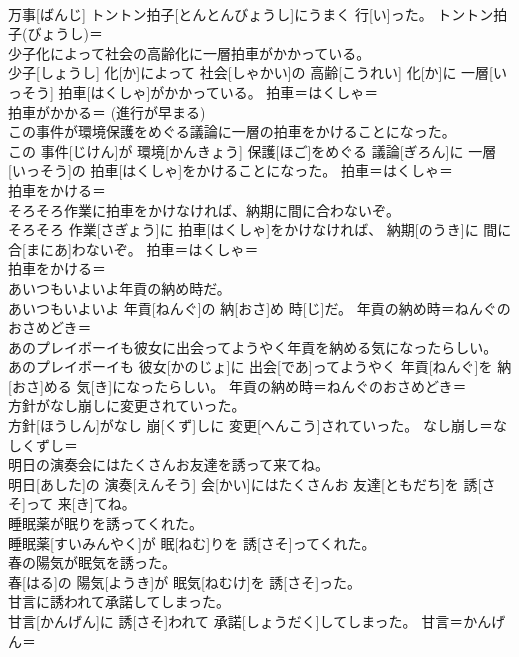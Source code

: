 \documentclass[8pt]{extreport}
\begin{document}
\begin{CJK}{UTF8}{min}
{\\	万事[ばんじ] トントン拍子[とんとんびょうし]にうまく 行[い]った。	トントン拍子(びょうし)＝ 
\\	少子化によって社会の高齢化に一層拍車がかかっている。	
\\	少子[しょうし] 化[か]によって 社会[しゃかい]の 高齢[こうれい] 化[か]に 一層[いっそう] 拍車[はくしゃ]がかかっている。	拍車＝はくしゃ＝ 
\\	拍車がかかる＝ (進行が早まる) 
\\	この事件が環境保護をめぐる議論に一層の拍車をかけることになった。	
\\	この 事件[じけん]が 環境[かんきょう] 保護[ほご]をめぐる 議論[ぎろん]に 一層[いっそう]の 拍車[はくしゃ]をかけることになった。	拍車＝はくしゃ＝ 
\\	拍車をかける＝　
\\	そろそろ作業に拍車をかけなければ、納期に間に合わないぞ。	
\\	そろそろ 作業[さぎょう]に 拍車[はくしゃ]をかけなければ、 納期[のうき]に 間に合[まにあ]わないぞ。	拍車＝はくしゃ＝ 
\\	拍車をかける＝　
\\	あいつもいよいよ年貢の納め時だ。	
\\	あいつもいよいよ 年貢[ねんぐ]の 納[おさ]め 時[じ]だ。	年貢の納め時＝ねんぐのおさめどき＝ 
\\	あのプレイボーイも彼女に出会ってようやく年貢を納める気になったらしい。	
\\	あのプレイボーイも 彼女[かのじょ]に 出会[であ]ってようやく 年貢[ねんぐ]を 納[おさ]める 気[き]になったらしい。	年貢の納め時＝ねんぐのおさめどき＝ 
\\	方針がなし崩しに変更されていった。	
\\	方針[ほうしん]がなし 崩[くず]しに 変更[へんこう]されていった。	なし崩し＝なしくずし＝ 
\\	明日の演奏会にはたくさんお友達を誘って来てね。	
\\	明日[あした]の 演奏[えんそう] 会[かい]にはたくさんお 友達[ともだち]を 誘[さそ]って 来[き]てね。	
\\	睡眠薬が眠りを誘ってくれた。	
\\	睡眠薬[すいみんやく]が 眠[ねむ]りを 誘[さそ]ってくれた。	
\\	春の陽気が眠気を誘った。	
\\	春[はる]の 陽気[ようき]が 眠気[ねむけ]を 誘[さそ]った。	
\\	甘言に誘われて承諾してしまった。	
\\	甘言[かんげん]に 誘[さそ]われて 承諾[しょうだく]してしまった。	甘言＝かんげん＝ 
}
\end{CJK}
\end{document}
